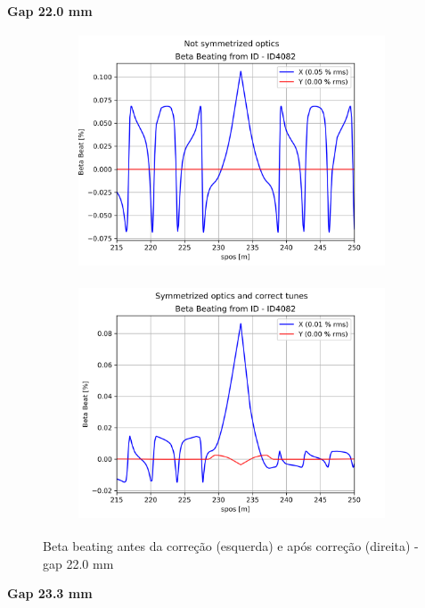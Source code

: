 \documentclass[a4paper,12pt]{article}
\begin{document}
\textbf{Gap 22.0 mm} \\

\begin{figure}[H]
\begin{subfigure}{0.5\textwidth}
\includegraphics[width=0.9\linewidth, height=7cm]{figs/phase25 gap22 uncorrected-optics.png} 
\label{fig:subim12522}
\end{subfigure}
\begin{subfigure}{0.5\textwidth}
\includegraphics[width=0.9\linewidth, height=7cm]{figs/phase25 gap22 corrected-optics-tunes.png}
\label{fig:subim22522}
\end{subfigure}
\caption{Beta beating antes da correção (esquerda) e após correção (direita) - gap 22.0 mm}
\label{fig:bb25_22}
\end{figure}

\textbf{Gap 23.3 mm} \\
\end{document}
